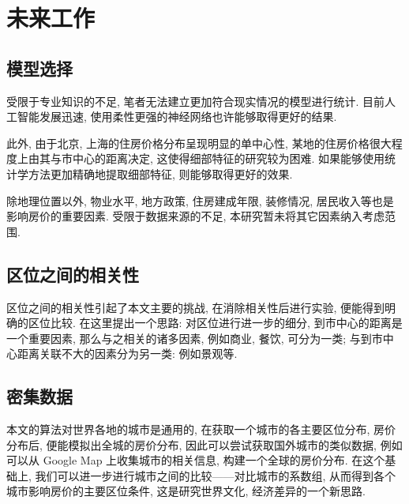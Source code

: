 \section{未来工作}
\subsection{模型选择}
受限于专业知识的不足, 笔者无法建立更加符合现实情况的模型进行统计.
目前人工智能发展迅速, 使用柔性更强的神经网络也许能够取得更好的结果.

此外, 由于北京, 上海的住房价格分布呈现明显的单中心性, 某地的住房价格很大程度上由其与市中心的距离决定, 这使得细部特征的研究较为困难.
如果能够使用统计学方法更加精确地提取细部特征, 则能够取得更好的效果.

除地理位置以外, 物业水平, 地方政策, 住房建成年限, 装修情况, 居民收入等也是影响房价的重要因素.
受限于数据来源的不足, 本研究暂未将其它因素纳入考虑范围.

\subsection{区位之间的相关性}
区位之间的相关性引起了本文主要的挑战, 在消除相关性后进行实验, 便能得到明确的区位比较.
在这里提出一个思路: 对区位进行进一步的细分, 到市中心的距离是一个重要因素, 那么与之相关的诸多因素, 例如商业, 餐饮, 可分为一类; 与到市中心距离关联不大的因素分为另一类: 例如景观等.

\subsection{密集数据}
本文的算法对世界各地的城市是通用的, 在获取一个城市的各主要区位分布, 房价分布后, 便能模拟出全城的房价分布, 因此可以尝试获取国外城市的类似数据, 例如可以从 Google Map 上收集城市的相关信息, 构建一个全球的房价分布.
在这个基础上, 我们可以进一步进行城市之间的比较——对比城市的系数组, 从而得到各个城市影响房价的主要区位条件, 这是研究世界文化, 经济差异的一个新思路.

